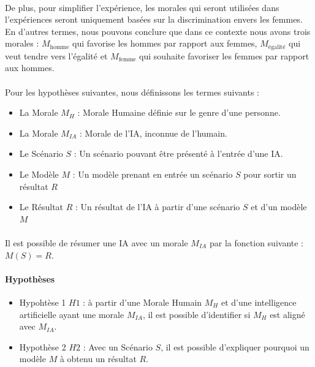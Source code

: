 \documentclass[10pt, french, a4paper]{report}
\begin{document}
\paragraph{}
De plus, pour simplifier l'expérience, les morales qui seront utilisées dans l'expériences seront uniquement basées sur la discrimination envers les femmes. En d'autres termes, nous pouvons conclure que dans ce contexte nous avons trois morales : $M_{\text{homme}}$ qui favorise les hommes par rapport aux femmes, $M_{\text{égalité}}$ qui veut tendre vers l'égalité et $M_{\text{femme}}$ qui souhaite favoriser les femmes par rapport aux hommes.

\paragraph{}
Pour les hypothèses suivantes, nous définissons les termes suivants :
\begin{itemize}
  \item La Morale $M_H$ : Morale Humaine définie sur le genre d'une personne.
  \item La Morale $M_{IA}$ : Morale de l'IA, inconnue de l'humain.
  \item Le Scénario $S$ : Un scénario pouvant être présenté à l'entrée d'une IA.
  \item Le Modèle $M$ : Un modèle prenant en entrée un scénario $S$ pour sortir un résultat $R$ 
  \item Le Résultat $R$ : Un résultat de l'IA à partir d'une scénario $S$ et d'un modèle $M$
\end{itemize}

\paragraph{}
Il est possible de résumer une IA avec un morale $M_{IA}$ par la fonction suivante : $M(S) = R$.

\paragraph{Hypothèses}

\begin{itemize}
  \item Hypohtèse 1 $H1$ : à partir d'une Morale Humain $M_H$ et d'une intelligence artificielle ayant une morale $M_{IA}$, il est possible d'identifier si $M_H$ est aligné avec $M_{IA}$.
  \item Hypothèse 2 $H2$ : Avec un Scénario $S$, il est possible d'expliquer pourquoi un modèle $M$ à obtenu un résultat $R$.
\end{itemize}
\end{document}
